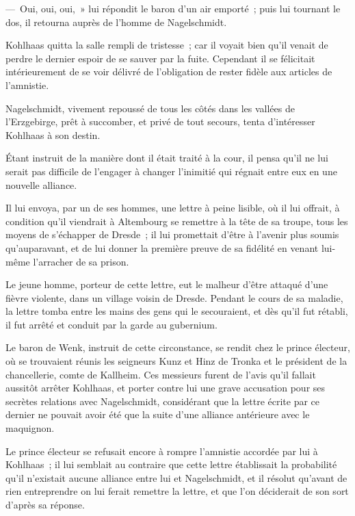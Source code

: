 \documentclass[french,twoside]{book} %
\begin{document}
— Oui, oui, oui, » lui répondit le baron d’un air emporté ; puis lui tournant le dos, il retourna auprès de l’homme de Nagelschmidt.\par
Kohlhaas quitta la salle rempli de tristesse ; car il voyait bien qu’il venait de perdre le dernier espoir de se sauver par la fuite. Cependant il se félicitait intérieurement de se voir délivré de l’obligation de rester fidèle aux articles de l’amnistie.\par
Nagelschmidt, vivement repoussé de tous les côtés dans les vallées de l’Erzgebirge, prêt à succomber, et privé de tout secours, tenta d’intéresser Kohlhaas à son destin.\par
Étant instruit de la manière dont il était traité à la cour, il pensa qu’il ne lui serait pas difficile de l’engager à changer l’inimitié qui régnait entre eux en une nouvelle alliance.\par
Il lui envoya, par un de ses hommes, une lettre à peine lisible, où il lui offrait, à condition qu’il viendrait à Altembourg se remettre à la tête de sa troupe, tous les moyens de s’échapper de Dresde ; il lui promettait d’être à l’avenir plus soumis qu’auparavant, et de lui donner la première preuve de sa fidélité en venant lui-même l’arracher de sa prison.\par
Le jeune homme, porteur de cette lettre, eut le malheur d’être attaqué d’une fièvre violente, dans un village voisin de Dresde. Pendant le cours de sa maladie, la lettre tomba entre les mains des gens qui le secouraient, et dès qu’il fut rétabli, il fut arrêté et conduit par la garde au gubernium.\par
Le baron de Wenk, instruit de cette circonstance, se rendit chez le prince électeur, où se trouvaient réunis les seigneurs Kunz et Hinz de Tronka et le président de la chancellerie, comte de Kallheim. Ces messieurs furent de l’avis qu’il fallait aussitôt arrêter Kohlhaas, et porter contre lui une grave accusation pour ses secrètes relations avec Nagelschmidt, considérant que la lettre écrite par ce dernier ne pouvait avoir été que la suite d’une alliance antérieure avec le maquignon.\par
Le prince électeur se refusait encore à rompre l’amnistie accordée par lui à Kohlhaas ; il lui semblait au contraire que cette lettre établissait la probabilité qu’il n’existait aucune alliance entre lui et Nagelschmidt, et il résolut qu’avant de rien entreprendre on lui ferait remettre la lettre, et que l’on déciderait de son sort d’après sa réponse.\par
\end{document}
